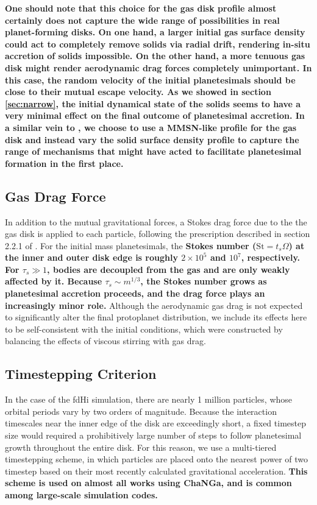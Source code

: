 \documentclass[twocolumn,linenumbers]{aastex63}
\begin{document}
\textbf{One should note that this choice for the gas disk profile almost certainly does not capture the wide range of possibilities in real planet-forming disks. 
On one hand, a larger initial gas surface density could act to completely remove solids via radial drift, rendering in-situ accretion of solids impossible. On the 
other hand, a more tenuous gas disk might render aerodynamic drag forces completely unimportant. In this case, the random velocity of the initial 
planetesimals should be close to their mutual escape velocity. As we showed in section \ref{sec:narrow}, the initial dynamical state of the solids seems to 
have a very minimal effect on the final outcome of planetesimal accretion. In a similar vein to \citet{hansen12}, we choose to use a MMSN-like profile for the 
gas disk and instead vary the solid surface density profile to capture the range of mechanisms that might have acted to facilitate planetesimal formation in the 
first place.}

\subsection{Gas Drag Force}

In addition to the mutual gravitational forces, a Stokes drag force due to the the gas disk is applied to each particle, following the prescription described in section 2.2.1 of \citet{morishima10}. For the initial mass planetesimals, the \textbf{Stokes number ($\textrm{St} = t_{s} \Omega$) at the inner and outer disk edge is roughly $2 \times 10^{5}$ and $10^{7}$, respectively. For $\tau_{s} \gg 1$, bodies are decoupled from the gas and are only weakly affected by it. Because $\tau_{s} \sim m^{1/3}$, the Stokes number grows as planetesimal accretion proceeds, and the drag force plays an increasingly minor role.} Although the aerodynamic gas drag is not expected to significantly alter the final protoplanet distribution, we include its effects here to be self-consistent with the initial conditions, which were constructed by balancing the effects of viscous stirring with gas drag.

\subsection{Timestepping Criterion}

In the case of the fdHi simulation, there are nearly 1 million
particles, whose orbital periods vary by two orders of magnitude. Because the
interaction timescales near the inner edge of the
disk are exceedingly short, a fixed timestep size would required a prohibitively large
number of steps to follow planetesimal growth throughout the entire
disk. For this reason, we use a multi-tiered timestepping scheme, in
which particles are placed onto the nearest power of two timestep
based on their most recently calculated gravitational
acceleration. \textbf{This scheme is used on almost all works using ChaNGa,
and is common among large-scale simulation codes.}
\end{document}

